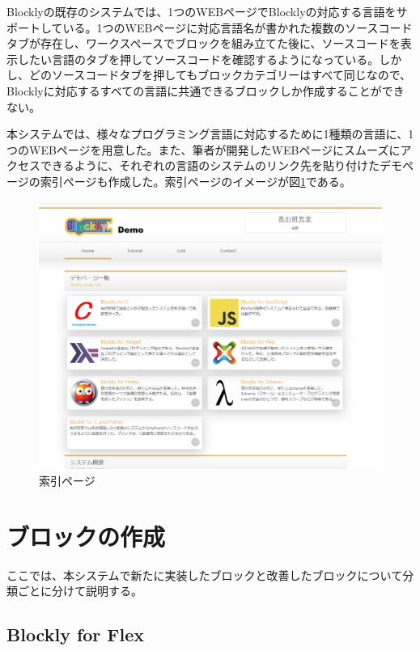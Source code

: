\documentclass{risepaper}
\begin{document}
Blocklyの既存のシステムでは、1つのWEBページでBlocklyの対応する言語をサポートしている。1つのWEBページに対応言語名が書かれた複数のソースコードタブが存在し、ワークスペースでブロックを組み立てた後に、ソースコードを表示したい言語のタブを押してソースコードを確認するようになっている。しかし、どのソースコードタブを押してもブロックカテゴリーはすべて同じなので、Blocklyに対応するすべての言語に共通できるブロックしか作成することができない。

本システムでは、様々なプログラミング言語に対応するために1種類の言語に、1つのWEBページを用意した。また、筆者が開発したWEBページにスムーズにアクセスできるように、それぞれの言語のシステムのリンク先を貼り付けたデモページの索引ページも作成した。索引ページのイメージが図\ref{fig:index}である。

\begin{figure}[h]
\begin{center}
\includegraphics[scale=0.5]{img/index.PNG}
\caption{索引ページ}%
\label{fig:index}
\end{center}%
\end{figure}%
   
   \section{ブロックの作成}

ここでは、本システムで新たに実装したブロックと改善したブロックについて分類ごとに分けて説明する。
   

   \subsection{Blockly for Flex}
\end{document}
